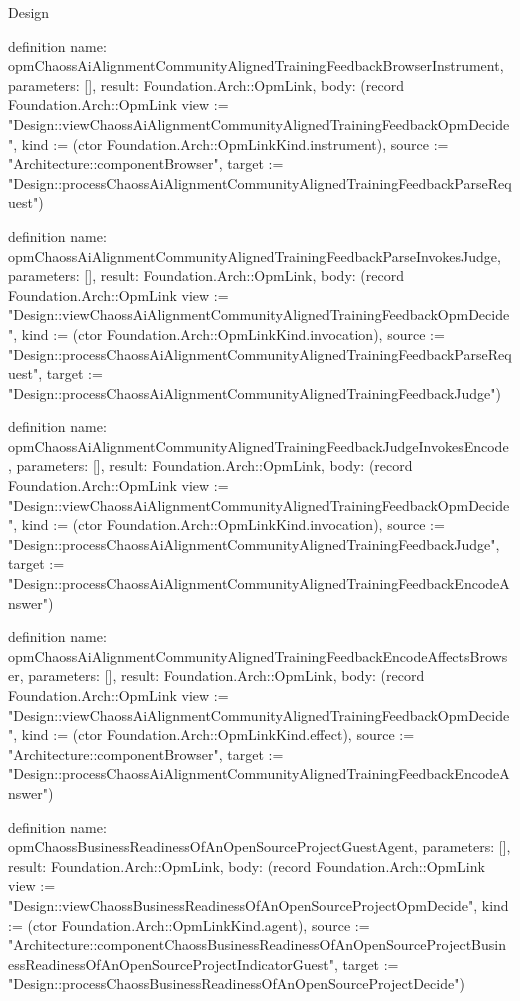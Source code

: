\begin{lexlean}{Design}
\begin{semanticmodule}
definition{
  name: opmChaossAiAlignmentCommunityAlignedTrainingFeedbackBrowserInstrument,
  parameters: [],
  result: Foundation.Arch::OpmLink,
  body: (record Foundation.Arch::OpmLink {view := "Design::viewChaossAiAlignmentCommunityAlignedTrainingFeedbackOpmDecide", kind := (ctor Foundation.Arch::OpmLinkKind.instrument), source := "Architecture::componentBrowser", target := "Design::processChaossAiAlignmentCommunityAlignedTrainingFeedbackParseRequest"})
}

definition{
  name: opmChaossAiAlignmentCommunityAlignedTrainingFeedbackParseInvokesJudge,
  parameters: [],
  result: Foundation.Arch::OpmLink,
  body: (record Foundation.Arch::OpmLink {view := "Design::viewChaossAiAlignmentCommunityAlignedTrainingFeedbackOpmDecide", kind := (ctor Foundation.Arch::OpmLinkKind.invocation), source := "Design::processChaossAiAlignmentCommunityAlignedTrainingFeedbackParseRequest", target := "Design::processChaossAiAlignmentCommunityAlignedTrainingFeedbackJudge"})
}

definition{
  name: opmChaossAiAlignmentCommunityAlignedTrainingFeedbackJudgeInvokesEncode,
  parameters: [],
  result: Foundation.Arch::OpmLink,
  body: (record Foundation.Arch::OpmLink {view := "Design::viewChaossAiAlignmentCommunityAlignedTrainingFeedbackOpmDecide", kind := (ctor Foundation.Arch::OpmLinkKind.invocation), source := "Design::processChaossAiAlignmentCommunityAlignedTrainingFeedbackJudge", target := "Design::processChaossAiAlignmentCommunityAlignedTrainingFeedbackEncodeAnswer"})
}

definition{
  name: opmChaossAiAlignmentCommunityAlignedTrainingFeedbackEncodeAffectsBrowser,
  parameters: [],
  result: Foundation.Arch::OpmLink,
  body: (record Foundation.Arch::OpmLink {view := "Design::viewChaossAiAlignmentCommunityAlignedTrainingFeedbackOpmDecide", kind := (ctor Foundation.Arch::OpmLinkKind.effect), source := "Architecture::componentBrowser", target := "Design::processChaossAiAlignmentCommunityAlignedTrainingFeedbackEncodeAnswer"})
}

definition{
  name: opmChaossBusinessReadinessOfAnOpenSourceProjectGuestAgent,
  parameters: [],
  result: Foundation.Arch::OpmLink,
  body: (record Foundation.Arch::OpmLink {view := "Design::viewChaossBusinessReadinessOfAnOpenSourceProjectOpmDecide", kind := (ctor Foundation.Arch::OpmLinkKind.agent), source := "Architecture::componentChaossBusinessReadinessOfAnOpenSourceProjectBusinessReadinessOfAnOpenSourceProjectIndicatorGuest", target := "Design::processChaossBusinessReadinessOfAnOpenSourceProjectDecide"})
}


\end{semanticmodule}
\end{lexlean}
